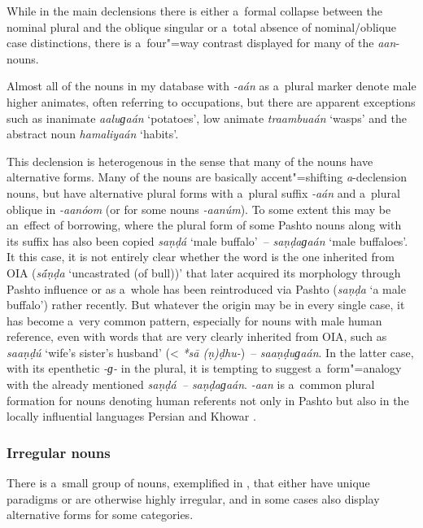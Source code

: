 While in the main declensions there is either a~formal collapse between the nominal plural and the oblique singular or a~total absence of nominal/oblique case distinctions, there is a~four"=way contrast displayed for many of the \textit{aan}-nouns.


Almost all of the nouns in my database with \textit{-aán} as a~plural marker denote male higher animates, often referring to occupations, but there are apparent exceptions such as inanimate \textit{aaluɡaán} `potatoes', low animate \textit{traambuaán} `wasps' and the abstract noun \textit{hamaliyaán} `habits'.


This declension is heterogenous in the sense that many of the nouns have alternative forms. Many of
the nouns are basically accent"=shifting \textit{a}-declension nouns, but have alternative plural
forms with a~plural suffix \textit{-aán} and a~plural oblique in
\textit{-aanóom} (or for some nouns \textit{-aanúm}). To some extent
this may be an~effect of borrowing, where the plural form of some Pashto nouns along with its suffix
has also been copied \textit{saṇḍá} `male buffalo'~-- \textit{saṇḍaɡaán} `male
buffaloes'. It this case, it is not entirely clear whether the word is the one inherited from OIA
(\textit{s\'{\={a}}ṇḍa} `uncastrated (of bull))' that later acquired its morphology through Pashto
influence or as a~whole has been reintroduced via Pashto (\textit{saṇḍa} `a male buffalo') rather
recently. But whatever the origin may be in every single case, it has become a~very common pattern,
especially for nouns with male human reference, even with words that are very clearly inherited from
OIA, such as \textit{saaṇḍú} `wife's sister's husband' ({\textless} \textit{*s\={a}\'{
  }(ṇ)ḍhu-})~-- \textit{saaṇḍuɡaán}. In the latter case, with its epenthetic
\textit{-ɡ-} in the plural, it is tempting to suggest a~form"=analogy with the already
mentioned \textit{saṇḍá~-- saṇḍaɡaán}. \textit{-aan} is a~common plural
formation for nouns denoting human referents not only in Pashto but also in the locally influential
languages Persian \citep[431]{windfuhrperry2009} and Khowar \citep[221--225]{endresenkristiansen1981}.

\subsubsection*{Irregular nouns}

There is a~small group of nouns, exemplified in , that either have unique paradigms or are otherwise highly irregular, and in some cases also display alternative forms for some categories. 

